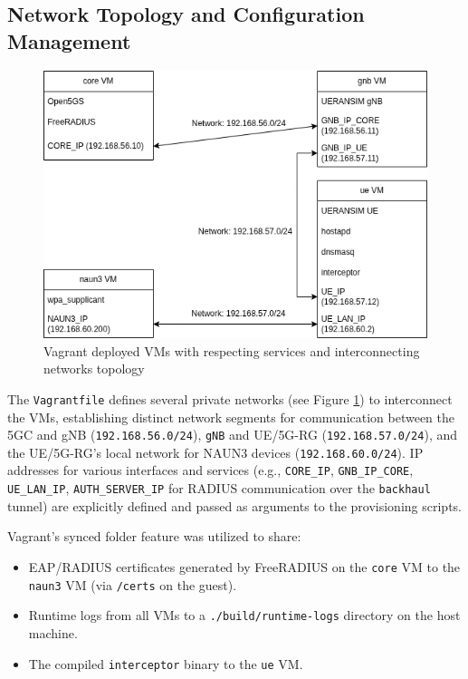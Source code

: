 \subsection{Network Topology and Configuration Management}

\begin{figure}
    \centering
    \includegraphics[width=0.75\linewidth]{figs/topology_vagrant_machine_topology.png}
    \caption{Vagrant deployed \acp{VM} with respecting services and interconnecting networks topology}
    \label{fig:topology_vagrant_machine_topology}
\end{figure}

The \texttt{Vagrantfile} defines several private networks (see Figure \ref{fig:topology_vagrant_machine_topology}) to interconnect the \acp{VM}, establishing distinct network segments for communication between the \ac{5GC} and \ac{gNB} (\texttt{192.168.56.0/24}), \texttt{gNB} and \ac{UE}/\ac{5G-RG} (\texttt{192.168.57.0/24}), and the \ac{UE}/\ac{5G-RG}'s local network for \ac{NAUN3} devices (\texttt{192.168.60.0/24}). \ac{IP} addresses for various interfaces and services (e.g., \texttt{CORE\_IP}, \texttt{GNB\_IP\_CORE}, \texttt{UE\_LAN\_IP}, \texttt{AUTH\_SERVER\_IP} for \ac{RADIUS} communication over the \texttt{backhaul} tunnel) are explicitly defined and passed as arguments to the provisioning scripts.

Vagrant's synced folder feature was utilized to share:

\begin{itemize}
    \item \ac{EAP}/\ac{RADIUS} certificates generated by FreeRADIUS on the \texttt{core} \ac{VM} to the \texttt{naun3} \ac{VM} (via \texttt{/certs} on the guest).

    \item Runtime logs from all \acp{VM} to a \texttt{./build/runtime-logs} directory on the host machine.

    \item The compiled \texttt{interceptor} binary to the \texttt{ue} \ac{VM}.
\end{itemize}

